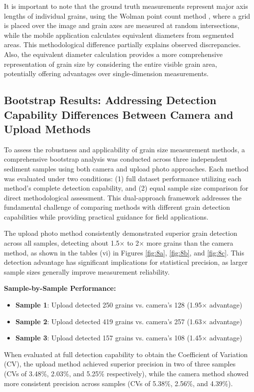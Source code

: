 \documentclass[final-report]{report-template}
\begin{document}
It is important to note that the ground truth measurements represent major axis lengths of individual grains, using the Wolman point count method \citep{Wolman1954}, where a grid is placed over the image and grain axes are measured at random intersections, while the mobile application calculates equivalent diameters from segmented areas. This methodological difference partially explains observed discrepancies. Also, the equivalent diameter calculation provides a more comprehensive representation of grain size by considering the entire visible grain area, potentially offering advantages over single-dimension measurements.

\subsection{Bootstrap Results: Addressing Detection Capability Differences Between Camera and Upload Methods}
To assess the robustness and applicability of grain size measurement methods, a comprehensive bootstrap analysis was conducted across three independent sediment samples using both camera and upload photo approaches. Each method was evaluated under two conditions: (1) full dataset performance utilizing each method's complete detection capability, and (2) equal sample size comparison for direct methodological assessment. This dual-approach framework addresses the fundamental challenge of comparing methods with different grain detection capabilities while providing practical guidance for field applications.

The upload photo method consistently demonstrated superior grain detection across all samples, detecting about 1.5× to 2× more grains than the camera method, as shown in the tables (vi) in Figures \ref{fig:8a}, \ref{fig:8b}, and \ref{fig:8c}. This detection advantage has significant implications for statistical precision, as larger sample sizes generally improve measurement reliability.

\textbf{Sample-by-Sample Performance:}

\begin{itemize}
    \item \textbf{Sample 1}: Upload detected 250 grains vs. camera's 128 (1.95× advantage)
\end{itemize}
\begin{itemize}
    \item \textbf{Sample 2}: Upload detected 419 grains vs. camera's 257 (1.63× advantage)
\end{itemize}
\begin{itemize}
    \item \textbf{Sample 3}: Upload detected 157 grains vs. camera's 108 (1.45× advantage)
\end{itemize}
When evaluated at full detection capability to obtain the Coefficient of Variation (CV), the upload method achieved superior precision in two of three samples (CVs of 3.48\%, 2.03\%, and 5.25\% respectively), while the camera method showed more consistent precision across samples (CVs of 5.38\%, 2.56\%, and 4.39\%).
\end{document}
